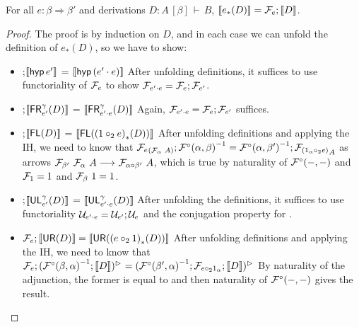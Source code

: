 \documentclass{drl-common/llncs}
\renewcommand{\sem}[1]{\ensuremath{ \llbracket #1 \rrbracket}}
\newcommand{\inv}[1]{\ensuremath{{#1}^{-1}}}
\newcommand{\arrow}[3]{\ensuremath{#2 \longrightarrow_{#1} #3}}
\newcommand{\tc}[2]{\ensuremath{#1 \Rightarrow #2}}
\newcommand\compo[2]{\ensuremath{#1 \circ #2}}
\newcommand\compv[2]{\ensuremath{#1 \cdot #2}}
\newcommand\comph[2]{\ensuremath{#1 \mathbin{\circ_2} #2}}
\newcommand\seq[3]{\ensuremath{#1 \, [ #2 ] \, \vdash \, #3}}
\newcommand\tr[2]{\ensuremath{{{#1}_{*}(#2)}}}
\newcommand\hyp[1]{\ensuremath{\dsd{hyp} \, {#1}}}
\newcommand\UL[3]{\ensuremath{\dsd{UL}^{#1}_{#2}(#3)}}
\newcommand\FR[3]{\ensuremath{\dsd{FR}^{#1}_{#2}(#3)}}
\newcommand\FL[1]{\ensuremath{\dsd{FL}(#1)}}
\newcommand\UR[1]{\ensuremath{\dsd{UR}(#1)}}
\begin{document}
\begin{lemma} \label{lem:semtr}
For all $e : \tc{\beta}{\beta'}$ and derivations $D : \seq{A}{\beta}{B}$, $\sem{\tr{e}{D}} = \semFo{e};{\sem{D}}$.  
\end{lemma}
\begin{proof}

The proof is by induction on $D$, and in each case we can unfold the
definition of \tr{e}{D}, so we have to show:

\begin{itemize}
\item {};{\sem{{\hyp e'}}} = \sem {\hyp {(\compv{e'}{e})}}
After unfolding definitions, it suffices to use functoriality of
${\mathcal{F}_{e}}$ to show $\semFo{\compv{e'}{e}} = \semFo{e};\semFo{e'}$.  

\item {};{\sem{{\FR \gamma {e'} D}}} = \sem{\FR \gamma {\compv{e'}{e}} D}
Again, $\semFo{\compv{e'}{e}} = \semFo{e};\semFo{e'}$ suffices.  

\item {};{\sem{{\FL D}}} = \sem{\FL {\tr{(\comph{1}{e})} D}}
After unfolding definitions and applying the IH, we need to know that
$\semFo{e}_{(\semF{\alpha} {A})}; \inv{\semFcomp(\alpha,\beta)} = \inv{\semFcomp(\alpha,\beta')}; \semFo{(\comph{1_\alpha}{e})}_{A}$
as arrows \arrow{}{\semF{\beta'}{\semF{\alpha}{A}}}{\semF{\compo \alpha {\beta'}}{A}},
which is true by naturality of $\mathcal{F}^\circ(-,-)$ and ${\mathcal{F}_{1}} = 1$ and $\mathcal{F}_{\beta} \,\, 1 = 1$.


\item {};{\sem{\UL \gamma {e'} D}} = \sem{ \UL \gamma {\compv{e'}{e}} D}
After unfolding the definitions, it suffices to use functoriality
$\semUo{\compv{e'}{e}} = \semUo{e'};\semUo{e}$ and the conjugation
property for \rtol{-}{}.  

\item $\semFo{e};{\sem{\UR D}} = \sem{\UR {\tr {(\comph{e}{1})} D}}$
After unfolding definitions and applying the IH, we need to know that
$\semFo{e};\ltor{(\inv{\semFcomp(\beta,\alpha)};\sem{D})}{} = 
\ltor{(\inv{\semFcomp(\beta',\alpha)};\semFo{\comph{e}{1_\alpha}};\sem{D})}{}$
By naturality of the adjunction, the former is equal to
\ltor{(\semF{\alpha}{(\semFo{e})};\inv{\semFcomp(\beta,\alpha)};\sem{D})}{}
and then naturality of $\mathcal{F}^\circ(-,-)$ gives the result.  

\end{itemize}

\end{proof}
\end{document}
